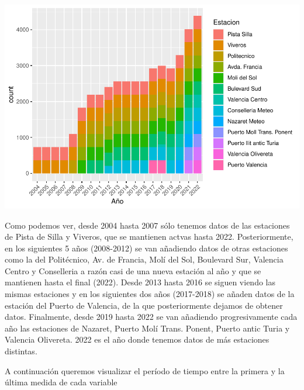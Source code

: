 \documentclass[notspecified,article,submit,moreauthors,pdftex]{Definitions/mdpi}
\begin{document}
\includegraphics{ProyectoAED2023_plantilla_files/figure-latex/unnamed-chunk-11-1.pdf}

Como podemos ver, desde 2004 hasta 2007 sólo tenemos datos de las
estaciones de Pista de Silla y Viveros, que se mantienen actvas hasta
2022. Posteriormente, en los siguientes 5 años (2008-2012) se van
añadiendo datos de otras estaciones como la del Politécnico, Av. de
Francia, Molí del Sol, Boulevard Sur, Valencia Centro y Conselleria a
razón casi de una nueva estación al año y que se mantienen hasta el
final (2022). Desde 2013 hasta 2016 se siguen viendo las mismas
estaciones y en los siguientes dos años (2017-2018) se añaden datos de
la estación del Puerto de Valencia, de la que posteriormente dejamos de
obtener datos. Finalmente, desde 2019 hasta 2022 se van añadiendo
progresivamente cada año las estaciones de Nazaret, Puerto Molí Trans.
Ponent, Puerto antic Turia y Valencia Olivereta. 2022 es el año donde
tenemos datos de más estaciones distintas.

A continuación queremos visualizar el período de tiempo entre la primera
y la última medida de cada variable
\end{document}
